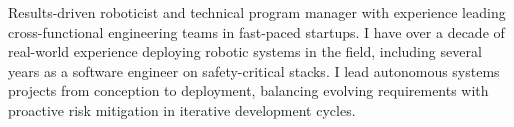 Results-driven roboticist and technical program manager with experience leading cross-functional engineering teams in fast-paced startups. I have over a decade of real-world experience deploying robotic systems in the field, including several years as a software engineer on safety-critical stacks. I lead autonomous systems projects from conception to deployment, balancing evolving requirements with proactive risk mitigation in iterative development cycles.
%
%
%
